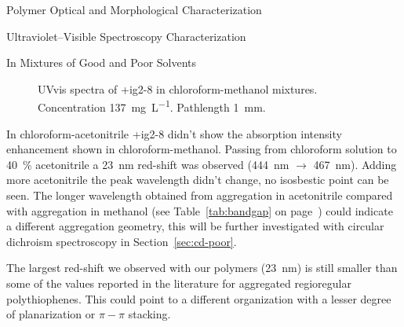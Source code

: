 \begin{section}{Polymer Optical and Morphological Characterization}
\begin{subsection}{Ultraviolet--Visible Spectroscopy Characterization}
\begin{subsubsection}{In Mixtures of Good and Poor Solvents}
\begin{figure}[tbp]%
 \caption[UV-vis spectra of \cmpd+{ig2-8} in chloro\-form-methanol mixtures.]{\gls{UVvis} spectra of \cmpd+{ig2-8} in chloro\-form-methanol mixtures. Concentration \SI{137}{\mg\per\liter}. Pathlength \SI{1}{\mm}.}
\label{fig:ig2-8-uvvis-meoh}
\end{figure}

In chloro\-form-aceto\-nitrile \cmpd+{ig2-8} didn't show the absorption intensity enhancement shown in chloro\-form-methanol. Passing from chloroform solution to 40~\% acetonitrile a \SI{23}{\nm} red-shift was observed (\SI{444}{\nm} $\rightarrow$ \SI{467}{\nm}). 
Adding more acetonitrile the peak wavelength didn't change, no iso\-sbestic point can be seen. \label{uvvis-ch3cn} The longer wavelength obtained from aggregation in acetonitrile compared with aggregation in methanol (see Table~\ref{tab:bandgap} on page~\pageref{tab:bandgap}) could indicate a different aggregation geometry, this will be further investigated with circular dichroism spectroscopy in Section~\ref{sec:cd-poor}. 

The largest red-shift we observed with our polymers (\SI{23}{\nm}) is still smaller than some of the values reported in the literature for aggregated regioregular poly\-thio\-phenes. This could point to a different organization with a lesser degree of planarization or $\pi-\pi$ stacking.


\end{subsubsection}
\end{subsection}
\end{section}
